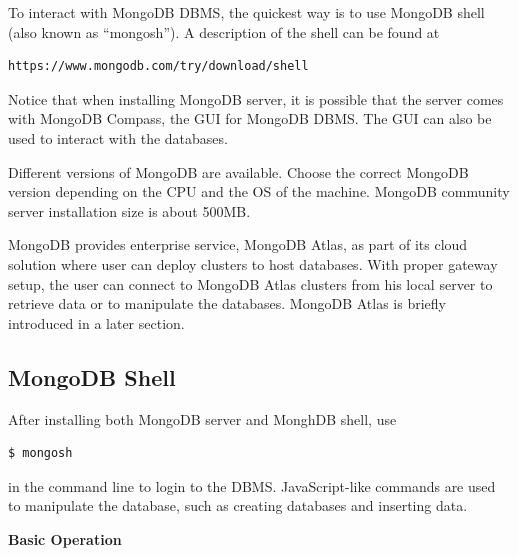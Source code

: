To interact with MongoDB DBMS, the quickest way is to use MongoDB shell (also known as ``mongosh''). A description of the shell can be found at
\begin{lstlisting}
https://www.mongodb.com/try/download/shell
\end{lstlisting}
Notice that when installing MongoDB server, it is possible that the server comes with MongoDB Compass, the GUI for MongoDB DBMS. The GUI can also be used to interact with the databases.

Different versions of MongoDB are available. Choose the correct MongoDB version depending on the CPU and the OS of the machine. MongoDB community server installation size is about 500MB.

MongoDB provides enterprise service, MongoDB Atlas, as part of its cloud solution where user can deploy clusters to host databases. With proper gateway setup, the user can connect to MongoDB Atlas clusters from his local server to retrieve data or to manipulate the databases. MongoDB Atlas is briefly introduced in a later section.

\subsection{MongoDB Shell}

After installing both MongoDB server and MonghDB shell, use
\begin{lstlisting}
$ mongosh
\end{lstlisting}
in the command line to login to the DBMS. JavaScript-like commands are used to manipulate the database, such as creating databases and inserting data.

\vspace{0.1in}
\noindent \textbf{Basic Operation}
\vspace{0.1in}

